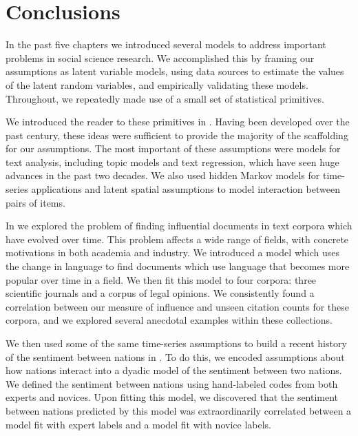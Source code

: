 \chapter{Conclusions}

In the past five chapters we introduced several models to address
important problems in social science research.  We accomplished this
by framing our assumptions as latent variable models, using data
sources to estimate the values of the latent random variables, and
empirically validating these models.  Throughout, we repeatedly made
use of a small set of statistical primitives.

 
We introduced the reader to these primitives in
.  Having been developed over the past
century, these ideas were sufficient to provide the majority of the
scaffolding for our assumptions.  The most important of these
assumptions were models for text analysis, including topic models and
text regression, which have seen huge advances in the past two
decades.  We also used hidden Markov models for time-series applications
and latent spatial assumptions to model interaction between pairs of items.

In  we explored the problem of finding influential
documents in text corpora which have evolved over time.  This problem
affects a wide range of fields, with concrete motivations in both
academia and industry.  We introduced a model which uses the change in
language to find documents which use language that becomes more
popular over time in a field.  We then fit this model to four corpora:
three scientific journals and a corpus of legal opinions. We
consistently found a correlation between our measure of influence and
unseen citation counts for these corpora, and we explored several
anecdotal examples within these collections.

We then used some of the same time-series assumptions to build a
recent history of the sentiment between nations in
.  To do this, we encoded assumptions about
how nations interact into a dyadic model of the sentiment between two
nations.  We defined the sentiment between nations using hand-labeled
codes from both experts and novices.  Upon fitting this model, we
discovered that the sentiment between nations predicted by this model
was extraordinarily correlated between a model fit with expert labels
and a model fit with novice labels.


